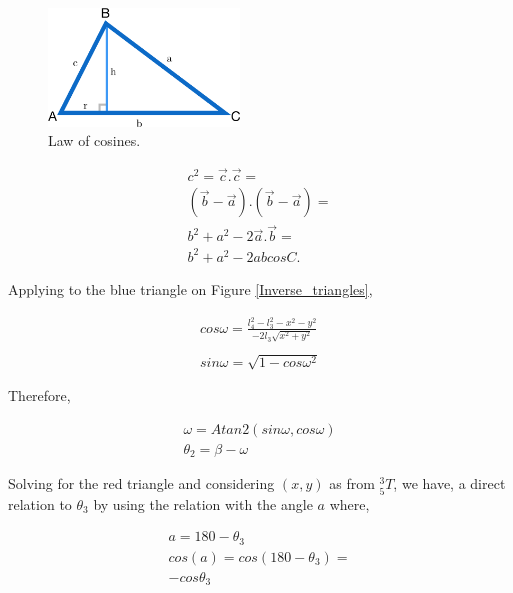 \documentclass[transmag]{IEEEtran}
\begin{document}
\begin{figure}[h]
\centerline{\includegraphics[width=2in]{./images/cosines}}
\caption{Law of cosines.\label{cosines}}
\end{figure}

\begin{equation}
\begin{matrix}
c^2 = \vec{c} . \vec{c} = \\
(\vec{b} - \vec{a}).(\vec{b} - \vec{a}) = \\
b^2 + a^2 - 2\vec{a} . \vec{b} = \\
b^2 + a^2 - 2 ab cosC.
\end{matrix}
\end{equation}

Applying to the blue triangle on Figure \ref{Inverse_triangles},

\begin{equation}
\begin{matrix}
cos\omega = \frac{l_4^2 - l_3^2 - x^2 - y^2}{-2l_3 \sqrt{x^2 + y^2}} \\
\\
sin \omega = \sqrt{1 - {cos \omega}^2}
\end{matrix}
\end{equation}

Therefore,

\begin{equation}
\begin{matrix}
\omega = Atan2(sin\omega, cos\omega) \\
\theta_2 = \beta - \omega
\end{matrix}
\end{equation}

Solving for the red triangle and considering $(x, y)$ as from $^3_5T$, we have, a direct relation to $\theta_3$ by using the relation with the angle $a$ where,

\begin{equation}
\begin{matrix}
a = 180 - \theta_3 \\
cos(a) = cos(180 - \theta_3) = \\
-cos\theta_3\\
\end{matrix}
\end{equation}
\end{document}
